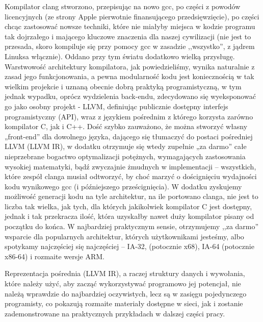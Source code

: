 Kompilator clang stworzono, przepisując na nowo gcc, po części z powodów licencyjnych (ze strony Apple pierwotnie finansującego przedsięwzięcie), po części chcąc zastosować nowsze techniki, które nie miałyby miejsca w kodzie programu tak dojrzałego i mającego kluczowe znaczenia dla naszej cywilizacji (nie jest to przesada, skoro kompiluje się przy pomocy gcc w zasadzie ,,wszystko'', z jądrem Linuksa włącznie). Oddano przy tym światu dodatkowo wielką przysługę. Warstwowość architektury kompilatora, jak powiedzieliśmy, wynika naturalnie z zasad jego funkcjonowania, a pewna modularność kodu jest koniecznością w tak wielkim projekcie i uznaną obecnie dobrą praktyką programistyczną, w tym jednak wypadku, oprócz wydzielenia back-endu, zdecydowano się wyeksponować go jako osobny projekt - LLVM, definiując publicznie dostępny interfejs programistyczny (API), wraz z językiem pośrednim z którego korzysta zarówno kompilator C, jak i C++. Dość szybko zauważono, że można stworzyć własny „front-end” dla dowolnego języka, dającego się tłumaczyć do postaci pośredniej LLVM (LLVM IR), w dodatku otrzymuje się wtedy zupełnie „za darmo” całe nieprzebrane bogactwo optymalizacji potężnych, wymagających zastosowania wysokiej matematyki, bądź zwyczajnie żmudnych w implementacji – wszystkich, które zespół clanga musiał odtworzyć, by choć marzyć o doścignięciu wydajności kodu wynikowego gcc (i późniejszego prześcignięcia). W dodatku zyskujemy możliwość generacji kodu na tyle architektur, na ile portowano clanga, nie jest to liczba tak wielka, jak tych, dla których jakikolwiek kompilator C jest dostępny, jednak i tak przekracza ilość, która uzyskałby nawet duży kompilator pisany od początku do końca. W najbardziej praktycznym sensie, otrzymujemy ,,za darmo'' wsparcie dla popularnych architektur, których użytkownikami jesteśmy, albo spotykamy najczęściej się najczęściej – IA-32, (potocznie x68), IA-64 (potocznie x86-64) i rozmaite wersje ARM.\cite{llvm_org}\cite{forum_llvm_apple_licenses}

Reprezentacja pośrednia (LLVM IR), a raczej struktury danych i wywołania, które należy użyć, aby zacząć wykorzystywać programowo jej potencjał, nie należą wprawdzie do najbardziej oczywistych, lecz są w zasięgu pojedynczego programisty, co pokazują rozmaite materiały dostępne w sieci\cite{kalleidoscope}, jak i zostanie zademonstrowane na praktycznych przykładach w dalszej części pracy.

